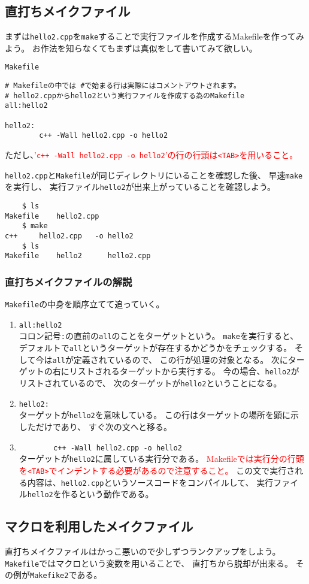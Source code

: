 
 \clearpage
 \subsection{直打ちメイクファイル}
まずは\texttt{hello2.cpp}を\verb|make|することで実行ファイルを作成するMakefileを作ってみよう。
お作法を知らなくてもまずは真似をして書いてみて欲しい。
\begin{itembox}{\texttt{Makefile}}
\begin{verbatim}
# Makefileの中では #で始まる行は実際にはコメントアウトされます。
# hello2.cppからhello2という実行ファイルを作成する為のMakefile
all:hello2

hello2:
        c++ -Wall hello2.cpp -o hello2
\end{verbatim}
\end{itembox}
ただし、\textcolor{red}{'\texttt{c++ -Wall hello2.cpp -o hello2}'の行の行頭は\texttt{<TAB>}を用いること。}

\texttt{hello2.cpp}と\texttt{Makefile}が同じディレクトリにいることを確認した後、
早速\verb|make|を実行し、
実行ファイル\texttt{hello2}が出来上がっていることを確認しよう。
\begin{verbatim}
	$ ls
Makefile	hello2.cpp
	$ make
c++     hello2.cpp   -o hello2
	$ ls
Makefile	hello2		hello2.cpp
\end{verbatim}


\subsubsection*{直打ちメイクファイルの解説}
\texttt{Makefile}の中身を順序立てて追っていく。
\begin{enumerate}
 \item \verb|all:hello2| \\
       コロン記号\verb|:|の直前の\verb|all|のことをターゲットという。
       \verb|make|を実行すると、デフォルトで\verb|all|というターゲットが存在するかどうかをチェックする。
       そして今は\verb|all|が定義されているので、
       この行が処理の対象となる。
       次にターゲットの右にリストされるターゲットから実行する。
       今の場合、\verb|hello2|がリストされているので、
       次のターゲットが\verb|hello2|ということになる。

 \item \verb|hello2:| \\
       ターゲットが\verb|hello2|を意味している。
       この行はターゲットの場所を顕に示しただけであり、
       すぐ次の文へと移る。
       
\item \verb|        c++ -Wall hello2.cpp -o hello2| \\
       ターゲットが\verb|hello2|に属している実行分である。
      \textcolor{red}{Makefileでは実行分の行頭を\texttt{<TAB>}でインデントする必要があるので注意すること。}
      この文で実行される内容は、\verb|hello2.cpp|というソースコードをコンパイルして、
      実行ファイル\verb|hello2|を作るという動作である。
\end{enumerate}



\clearpage
 \subsection{マクロを利用したメイクファイル}
 直打ちメイクファイルはかっこ悪いので少しずつランクアップをしよう。
 \texttt{Makefile}ではマクロという変数を用いることで、
 直打ちから脱却が出来る。
 その例が\texttt{Makefike2}である。